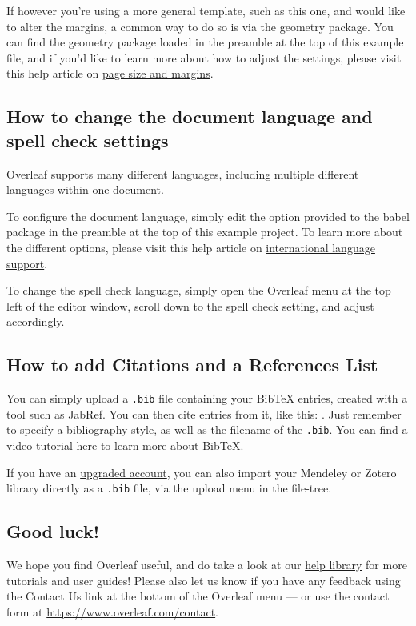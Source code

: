 \documentclass{article}
\begin{document}
If however you're using a more general template, such as this one, and would like to alter the margins, a common way to do so is via the geometry package. You can find the geometry package loaded in the preamble at the top of this example file, and if you'd like to learn more about how to adjust the settings, please visit this help article on \href{https://www.overleaf.com/learn/latex/page_size_and_margins}{page size and margins}.

\subsection{How to change the document language and spell check settings}

Overleaf supports many different languages, including multiple different languages within one document.

To configure the document language, simply edit the option provided to the babel package in the preamble at the top of this example project. To learn more about the different options, please visit this help article on \href{https://www.overleaf.com/learn/latex/International_language_support}{international language support}.

To change the spell check language, simply open the Overleaf menu at the top left of the editor window, scroll down to the spell check setting, and adjust accordingly.

\subsection{How to add Citations and a References List}

You can simply upload a \verb|.bib| file containing your BibTeX entries, created with a tool such as JabRef. You can then cite entries from it, like this: \cite{greenwade93}. Just remember to specify a bibliography style, as well as the filename of the \verb|.bib|. You can find a \href{https://www.overleaf.com/help/97-how-to-include-a-bibliography-using-bibtex}{video tutorial here} to learn more about BibTeX.

If you have an \href{https://www.overleaf.com/user/subscription/plans}{upgraded account}, you can also import your Mendeley or Zotero library directly as a \verb|.bib| file, via the upload menu in the file-tree.

\subsection{Good luck!}

We hope you find Overleaf useful, and do take a look at our \href{https://www.overleaf.com/learn}{help library} for more tutorials and user guides! Please also let us know if you have any feedback using the Contact Us link at the bottom of the Overleaf menu --- or use the contact form at \url{https://www.overleaf.com/contact}.





\end{document}
